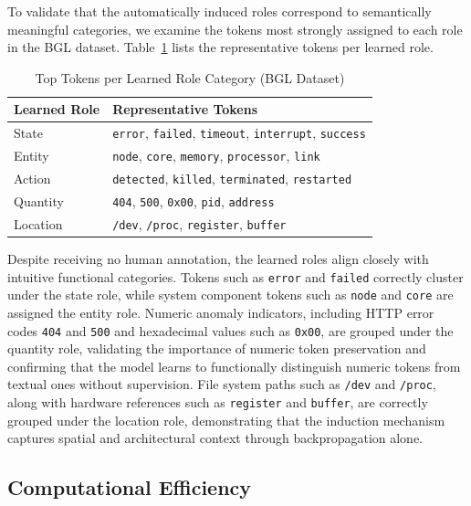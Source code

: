 To validate that the automatically induced roles correspond to semantically meaningful categories, we examine the tokens most strongly assigned to each role in the BGL dataset. Table~\ref{tab:role_examples} lists the representative tokens per learned role.

\begin{table}[t]
\centering
\caption{Top Tokens per Learned Role Category (BGL Dataset)}
\label{tab:role_examples}
\begin{tabular}{@{}ll@{}}
\toprule
\textbf{Learned Role} & \textbf{Representative Tokens} \\
\midrule
State    & \texttt{error}, \texttt{failed}, \texttt{timeout}, \texttt{interrupt}, \texttt{success} \\
Entity   & \texttt{node}, \texttt{core}, \texttt{memory}, \texttt{processor}, \texttt{link} \\
Action   & \texttt{detected}, \texttt{killed}, \texttt{terminated}, \texttt{restarted} \\
Quantity & \texttt{404}, \texttt{500}, \texttt{0x00}, \texttt{pid}, \texttt{address} \\
Location & \texttt{/dev}, \texttt{/proc}, \texttt{register}, \texttt{buffer} \\
\bottomrule
\end{tabular}
\end{table}

Despite receiving no human annotation, the learned roles align closely with intuitive functional categories. Tokens such as \texttt{error} and \texttt{failed} correctly cluster under the state role, while system component tokens such as \texttt{node} and \texttt{core} are assigned the entity role. Numeric anomaly indicators, including HTTP error codes \texttt{404} and \texttt{500} and hexadecimal values such as \texttt{0x00}, are grouped under the quantity role, validating the importance of numeric token preservation and confirming that the model learns to functionally distinguish numeric tokens from textual ones without supervision. File system paths such as \texttt{/dev} and \texttt{/proc}, along with hardware references such as \texttt{register} and \texttt{buffer}, are correctly grouped under the location role, demonstrating that the induction mechanism captures spatial and architectural context through backpropagation alone.

\subsection{Computational Efficiency}

